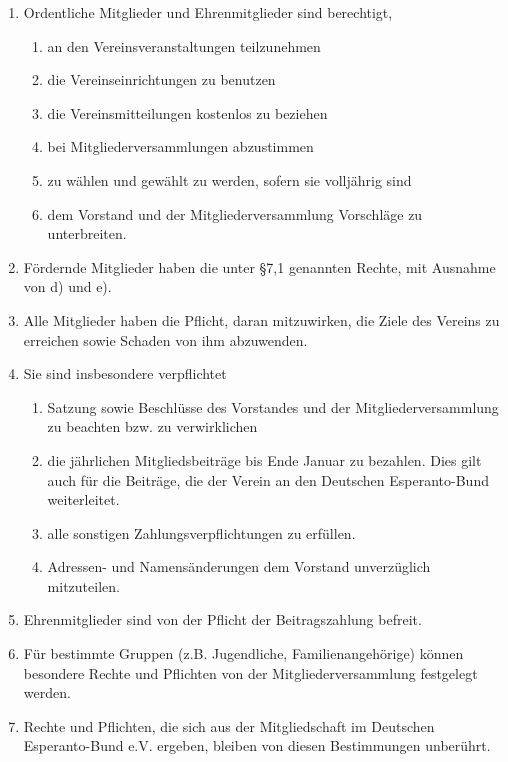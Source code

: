 \documentclass[11pt]{article}
\begin{document}
\begin{enumerate}[label=\arabic*)]
	\item Ordentliche Mitglieder und Ehrenmitglieder sind berechtigt,
	\begin{enumerate}[label=\alph*)]
		\item an den Vereinsveranstaltungen teilzunehmen
		\item die Vereinseinrichtungen zu benutzen
		\item die Vereinsmitteilungen kostenlos zu beziehen
		\item bei Mitgliederversammlungen abzustimmen
		\item zu wählen und gewählt zu werden, sofern sie volljährig sind
		\item dem Vorstand und der Mitgliederversammlung Vorschläge zu unterbreiten.
	\end{enumerate}
	\item Fördernde Mitglieder haben die unter §7,1 genannten Rechte, mit Ausnahme von d) und e).
	\item Alle Mitglieder haben die Pflicht, daran mitzuwirken, die Ziele des Vereins zu erreichen sowie Schaden von ihm abzuwenden.
	\item Sie sind insbesondere verpflichtet
		\begin{enumerate}[label=\alph*)]
		\item Satzung sowie Beschlüsse des Vorstandes und der Mitgliederversammlung zu beachten bzw. zu verwirklichen
		\item die jährlichen Mitgliedsbeiträge bis Ende Januar zu bezahlen. Dies gilt auch für die Beiträge, die der Verein an den Deutschen Esperanto-Bund weiterleitet.
		\item alle sonstigen Zahlungsverpflichtungen zu erfüllen.
		\item Adressen- und Namensänderungen dem Vorstand unverzüglich mitzuteilen.
	\end{enumerate}
	\item Ehrenmitglieder sind von der Pflicht der Beitragszahlung befreit.
	\item Für bestimmte Gruppen (z.B. Jugendliche, Familienangehörige) können besondere Rechte und Pflichten von der Mitgliederversammlung festgelegt werden.
	\item Rechte und Pflichten, die sich aus der Mitgliedschaft im Deutschen Esperanto-Bund e.V. ergeben, bleiben von diesen Bestimmungen unberührt.
\end{enumerate}
\end{document}
